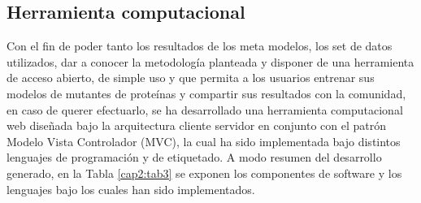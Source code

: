 \subsection{Herramienta computacional}

Con el fin de poder tanto los resultados de los meta modelos, los set de datos utilizados, dar a conocer la metodología planteada y disponer de una herramienta de acceso abierto, de simple uso y que permita a los usuarios entrenar sus modelos de mutantes de proteínas y compartir sus resultados con la comunidad, en caso de querer efectuarlo, se ha desarrollado una herramienta computacional web diseñada bajo la arquitectura cliente servidor en conjunto con el patrón Modelo Vista Controlador (MVC), la cual ha sido implementada bajo distintos lenguajes de programación y de etiquetado. A modo resumen del desarrollo generado, en la Tabla \ref{cap2:tab3} se exponen los componentes de software y los lenguajes bajo los cuales han sido implementados.


